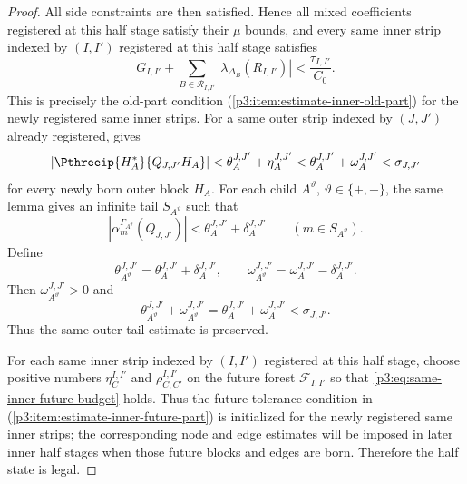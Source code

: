 \documentclass[11pt,reqno]{amsart}
\makeatletter
\theoremstyle{plain}
\theoremstyle{definition}
\newcounter{problempaper}
\newenvironment{problempaperbody}{%
  \setcounter{subsection}{0}%
  \setcounter{subsubsection}{0}%
  \setcounter{paragraph}{0}%
  \renewcommand{\thesubsection}{\arabic{subsection}}%
  \renewcommand{\thesubsubsection}{\thesubsection.\arabic{subsubsection}}%
  \renewcommand{\theparagraph}{\thesubsubsection.\arabic{paragraph}}%
  \let\problem@outersection\section
  \let\problem@outersubsection\subsection
  \let\problem@outersubsubsection\subsubsection
  \let\problem@outerparagraph\paragraph
  \let\section\problem@papersection
  \let\subsection\problem@papersubsection
  \let\subsubsection\problem@papersubsubsection
}{%
  \let\section\problem@outersection
  \let\subsection\problem@outersubsection
  \let\subsubsection\problem@outersubsubsection
  \let\paragraph\problem@outerparagraph
}
\newcommand{\problem@target}[2]{%
  \hypertarget{problem-\theproblempaper-#1-#2}{}%
}
\newcommand{\problem@paperheading}[3]{%
  \par\bigskip
  \problem@target{#1}{#2}%
  \noindent{\large\bfseries #2.\quad #3\par}%
  \nobreak\smallskip
}
\newcommand{\problem@papersubheading}[3]{%
  \par\medskip
  \problem@target{#1}{#2}%
  \noindent{\normalsize\bfseries #2.\quad #3\par}%
  \nobreak\smallskip
}
\newcommand{\problem@papersubsubheading}[3]{%
  \par\smallskip
  \problem@target{#1}{#2}%
  \noindent{\normalsize\itshape #2.\quad #3.\ }%
}
\def\problem@papersection{%
  \@ifstar{\problem@papersectionstar}{\problem@papersectionnostar}%
}
\def\problem@papersectionstar#1{%
  \par\bigskip\noindent{\large\bfseries #1\par}\nobreak\smallskip
}
\def\problem@papersectionnostar#1{%
  \refstepcounter{subsection}%
  \setcounter{subsubsection}{0}%
  \setcounter{paragraph}{0}%
  \problem@paperheading{section}{\thesubsection}{#1}%
  \problem@writecontentsline{section}{\thesubsection}{#1}%
}
\def\problem@papersubsection{%
  \@ifstar{\problem@papersubsectionstar}{\problem@papersubsectionnostar}%
}
\def\problem@papersubsectionstar#1{%
  \par\medskip\noindent{\normalsize\bfseries #1\par}\nobreak\smallskip
}
\def\problem@papersubsectionnostar#1{%
  \refstepcounter{subsubsection}%
  \setcounter{paragraph}{0}%
  \problem@papersubheading{subsection}{\thesubsubsection}{#1}%
  \problem@writecontentsline{subsection}{\thesubsubsection}{#1}%
}
\def\problem@papersubsubsection{%
  \@ifstar{\problem@papersubsubsectionstar}{\problem@papersubsubsectionnostar}%
}
\def\problem@papersubsubsectionstar#1{%
  \par\smallskip\noindent{\normalsize\itshape #1.\ }%
}
\def\problem@papersubsubsectionnostar#1{%
  \refstepcounter{paragraph}%
  \problem@papersubsubheading{subsubsection}{\theparagraph}{#1}%
  \problem@writecontentsline{subsubsection}{\theparagraph}{#1}%
}
\newcommand{\problem@writecontentsline}[3]{%
  \begingroup
  \protected@write\@auxout{}{%
    \string\problemcontentsentry{\theproblempaper}{#1}{#2}{#3}{\thepage}%
  }%
  \endgroup
}
\newcommand{\problemcontentsentry}[5]{%
  \@ifundefined{problemcontents@#1}{%
    \expandafter\gdef\csname problemcontents@#1\endcsname{}%
  }{}%
  \expandafter\g@addto@macro\csname problemcontents@#1\endcsname{%
    \problemcontentsline{#1}{#2}{#3}{#4}{#5}%
  }%
}
\newcommand{\problemcontentslink}[4]{%
  \hyperlink{problem-#1-#2-#3}{#4}%
}
\newcommand{\problemcontentsline}[5]{%
  \ifstrequal{#2}{section}{%
    \par\noindent
    \problemcontentslink{#1}{#2}{#3}{\makebox[2.5em][l]{#3}#4}%
    \nobreak\dotfill
    \problemcontentslink{#1}{#2}{#3}{#5}\par
  }{%
    \ifstrequal{#2}{subsection}{%
      \par\noindent\hspace*{1.5em}%
      \problemcontentslink{#1}{#2}{#3}{\makebox[3.5em][l]{#3}#4}%
      \nobreak\dotfill
      \problemcontentslink{#1}{#2}{#3}{#5}\par
    }{%
      \par\noindent\hspace*{3em}%
      \problemcontentslink{#1}{#2}{#3}{\makebox[4.5em][l]{#3}#4}%
      \nobreak\dotfill
      \problemcontentslink{#1}{#2}{#3}{#5}\par
    }%
  }%
}
\makeatother
\begin{document}
\begin{problempaperbody}
\begin{proof}
All side constraints are then satisfied. Hence all mixed coefficients registered at this half stage satisfy their $\mu$ bounds, and every same inner strip indexed by $(I,I')$ registered at this half stage satisfies
\begin{equation*}
        G_{I,I'}+\sum_{B\in\mathcal R_{I,I'}}|\lambda_{\Delta_B}(R_{I,I'})|<\frac{\tau_{I,I'}}{C_0}.
\end{equation*}
This is precisely the old-part condition \textup{(\ref{p3:item:estimate-inner-old-part})} for the newly registered same inner strips.
For a same outer strip indexed by $(J,J')$ already registered,  gives
\begin{equation*}
        |\Pthreeip{H_A^*}{Q_{J,J'}H_A}|<\theta_A^{J,J'}+\eta_A^{J,J'}<\theta_A^{J,J'}+\omega_A^{J,J'}<\sigma_{J,J'}
\end{equation*}
for every newly born outer block $H_A$. For each child $A^\vartheta$, $\vartheta\in\{+,-\}$, the same lemma gives an infinite tail $S_{A^\vartheta}$ such that
\begin{equation*}
        |\alpha_m^{\Gamma_{A^\vartheta}}(Q_{J,J'})|<\theta_A^{J,J'}+\delta_A^{J,J'}\qquad(m\in S_{A^\vartheta}).
\end{equation*}
Define
\begin{equation*}
        \theta_{A^\vartheta}^{J,J'}=\theta_A^{J,J'}+\delta_A^{J,J'},\qquad \omega_{A^\vartheta}^{J,J'}=\omega_A^{J,J'}-\delta_A^{J,J'}.
\end{equation*}
Then $\omega_{A^\vartheta}^{J,J'}>0$ and
\begin{equation*}
        \theta_{A^\vartheta}^{J,J'}+\omega_{A^\vartheta}^{J,J'}=\theta_A^{J,J'}+\omega_A^{J,J'}<\sigma_{J,J'}.
\end{equation*}
Thus the same outer tail estimate is preserved.

For each same inner strip indexed by $(I,I')$ registered at this half stage, choose positive numbers $\eta_C^{I,I'}$ and $\rho_{C,C'}^{I,I'}$ on the future forest $\mathcal F_{I,I'}$ so that \eqref{p3:eq:same-inner-future-budget} holds. Thus the future tolerance condition in \textup{(\ref{p3:item:estimate-inner-future-part})} is initialized for the newly registered same inner strips; the corresponding node and edge estimates will be imposed in later inner half stages when those future blocks and edges are born. Therefore the half state is legal.
\end{proof}


\end{problempaperbody}
\end{document}
